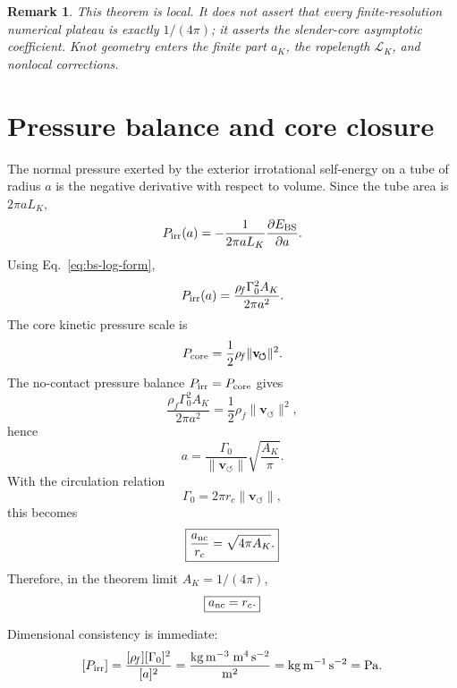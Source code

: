 \documentclass[11pt]{article}
\newcommand{\vnorm}{\lVert\mathbf{v}_{\!\boldsymbol{\circlearrowleft}}\rVert}
\newcommand{\rhof}{\rho_{\!f}}
\newcommand{\rc}{r_c}
\newcommand{\LK}{\mathcal L_K}
\newtheorem{remark}{Remark}
\begin{document}
\begin{remark}
This theorem is local.  It does not assert that every finite-resolution numerical plateau is
exactly \(1/(4\pi)\); it asserts the slender-core asymptotic coefficient.  Knot geometry enters
the finite part \(a_K\), the ropelength \(\LK\), and nonlocal corrections.
\end{remark}

\section{Pressure balance and core closure}
\label{sec:pressure}

The normal pressure exerted by the exterior irrotational self-energy on a tube of radius \(a\)
is the negative derivative with respect to volume.  Since the tube area is \(2\pi aL_K\),
\begin{equation}
  P_{\rm irr}(a)
  =
  -\frac{1}{2\pi aL_K}\frac{\partial E_{\rm BS}}{\partial a}.
\end{equation}
Using Eq.~\eqref{eq:bs-log-form},
\begin{equation}
  P_{\rm irr}(a)
  =
  \frac{\rhof\Gamma_0^2A_K}{2\pi a^2}.
  \label{eq:Pirr}
\end{equation}
The core kinetic pressure scale is
\begin{equation}
  P_{\rm core}
  =
  \frac{1}{2}\rhof\vnorm^2.
  \label{eq:Pcore}
\end{equation}
The no-contact pressure balance \(P_{\rm irr}=P_{\rm core}\) gives
\begin{equation}
  \frac{\rhof\Gamma_0^2A_K}{2\pi a^2}
  =
  \frac{1}{2}\rhof\vnorm^2,
\end{equation}
hence
\begin{equation}
  a
  =
  \frac{\Gamma_0}{\vnorm}\sqrt{\frac{A_K}{\pi}}.
\end{equation}
With the circulation relation
\begin{equation}
  \Gamma_0=2\pi \rc\vnorm,
  \label{eq:gamma-relation}
\end{equation}
this becomes
\begin{equation}
  \boxed{\frac{a_{\rm nc}}{\rc}=\sqrt{4\pi A_K}.}
  \label{eq:anc}
\end{equation}
Therefore, in the theorem limit \(A_K=1/(4\pi)\),
\begin{equation}
  \boxed{a_{\rm nc}=\rc.}
\end{equation}

Dimensional consistency is immediate:
\[
  [P_{\rm irr}]
  =
  \frac{[\rhof][\Gamma_0]^2}{[a]^2}
  =
  \frac{\mathrm{kg\,m^{-3}}\;\mathrm{m^4\,s^{-2}}}{\mathrm{m^2}}
  =
  \mathrm{kg\,m^{-1}\,s^{-2}}
  =
  \mathrm{Pa}.
\]
\end{document}

